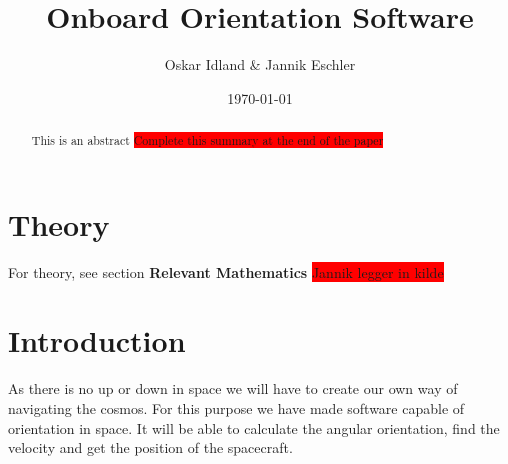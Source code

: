 \documentclass[reprint,english,notitlepage]{revtex4-2}
\begin{document}
\title{Onboard Orientation Software}
\author{Oskar Idland \& Jannik Eschler}
\date{\today}

\begin{abstract}
    This is an abstract \colorbox{red}{Complete this summary at the end of the paper}
\end{abstract}
\maketitle

\section{Theory} \label{sec:theory}
For theory, see section \textbf{Relevant Mathematics} \colorbox{red}{Jannik legger in kilde} 
  


\section{Introduction} \label{sec:introduction}
As there is no up or down in space we will have to create our own way of navigating the cosmos. For this purpose we have made software capable of orientation in space. It will be able to calculate the angular orientation, find the velocity and get the position of the spacecraft. 
\end{document}
